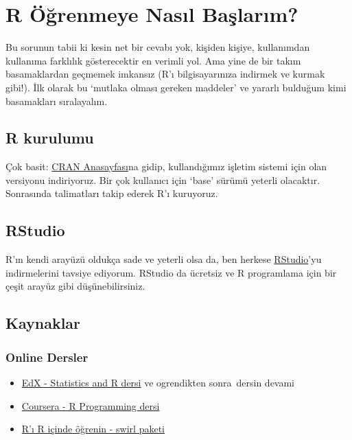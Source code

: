 \documentclass[
]{book}
\providecommand{\tightlist}{%
  \setlength{\itemsep}{0pt}\setlength{\parskip}{0pt}}
\begin{document}
\hypertarget{r-uxf6ux11frenmeye-nasux131l-baux15flarux131m}{%
\section{R Öğrenmeye Nasıl Başlarım?}\label{r-uxf6ux11frenmeye-nasux131l-baux15flarux131m}}

Bu sorunun tabii ki kesin net bir cevabı yok, kişiden kişiye, kullanımdan kullanıma farklılık gösterecektir en verimli yol. Ama yine de bir takım basamaklardan geçmemek imkansız (R'ı bilgisayarınıza indirmek ve kurmak gibi!). İlk olarak bu `mutlaka olması gereken maddeler' ve yararlı bulduğum kimi basamakları sıralayalım.

\hypertarget{r-kurulumu}{%
\subsection{R kurulumu}\label{r-kurulumu}}

Çok basit: \href{https://cran.r-project.org}{CRAN Anasayfası}na gidip, kullandığımız işletim sistemi için olan versiyonu indiriyoruz. Bir çok kullanıcı için `base' sürümü yeterli olacaktır. Sonrasında talimatları takip ederek R'ı kuruyoruz.

\hypertarget{rstudio}{%
\subsection{RStudio}\label{rstudio}}

R'ın kendi arayüzü oldukça sade ve yeterli olsa da, ben herkese \href{https://www.rstudio.com/}{RStudio}'yu indirmelerini tavsiye ediyorum. RStudio da ücretsiz ve R programlama için bir çeşit arayüz gibi düşünebilirsiniz.

\hypertarget{kaynaklar}{%
\subsection{Kaynaklar}\label{kaynaklar}}

\hypertarget{online-dersler}{%
\subsubsection{Online Dersler}\label{online-dersler}}

\begin{itemize}
\tightlist
\item
  \href{https://www.edx.org/course/statistics-r-harvardx-ph525-1x-1}{EdX - Statistics and R dersi} ve ogrendikten sonra~dersin devami
\item
  \href{https://www.coursera.org/learn/r-programming}{Coursera - R Programming dersi}
\item
  \href{https://swirlstats.com/}{R'ı R içinde öğrenin - swirl paketi}
\end{itemize}
\end{document}
